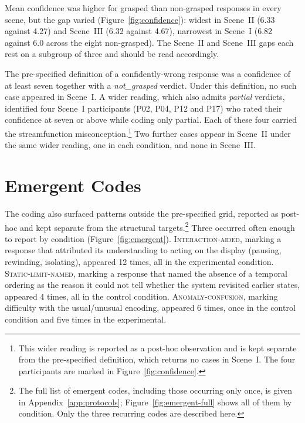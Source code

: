 Mean confidence was higher for grasped than non-grasped responses in every scene, but the gap varied (Figure~\ref{fig:confidence}): widest in Scene~II (6.33 against 4.27) and Scene~III (6.32 against 4.67), narrowest in Scene~I (6.82 against 6.0 across the eight non-grasped). The Scene~II and Scene~III gaps each rest on a subgroup of three and should be read accordingly.

The pre-specified definition of a confidently-wrong response was a confidence of at least seven together with a \emph{not\_grasped} verdict. Under this definition, no such case appeared in Scene~I. A wider reading, which also admits \emph{partial} verdicts, identified four Scene~I participants (P02, P04, P12 and P17) who rated their confidence at seven or above while coding only partial. Each of these four carried the streamfunction misconception.\footnote{This wider reading is reported as a post-hoc observation and is kept separate from the pre-specified definition, which returns no cases in Scene~I. The four participants are marked in Figure~\ref{fig:confidence}.} Two further cases appear in Scene~II under the same wider reading, one in each condition, and none in Scene~III.

\section{Emergent Codes}
\label{sec:res-emergent}

The coding also surfaced patterns outside the pre-specified grid, reported as post-hoc and kept separate from the structural targets.\footnote{The full list of emergent codes, including those occurring only once, is given in Appendix~\ref{app:protocols}; Figure~\ref{fig:emergent-full} shows all of them by condition. Only the three recurring codes are described here.} Three occurred often enough to report by condition (Figure~\ref{fig:emergent}). \textsc{Interaction-aided}, marking a response that attributed its understanding to acting on the display (pausing, rewinding, isolating), appeared 12 times, all in the experimental condition. \textsc{Static-limit-named}, marking a response that named the absence of a temporal ordering as the reason it could not tell whether the system revisited earlier states, appeared 4 times, all in the control condition. \textsc{Anomaly-confusion}, marking difficulty with the usual/unusual encoding, appeared 6 times, once in the control condition and five times in the experimental.

